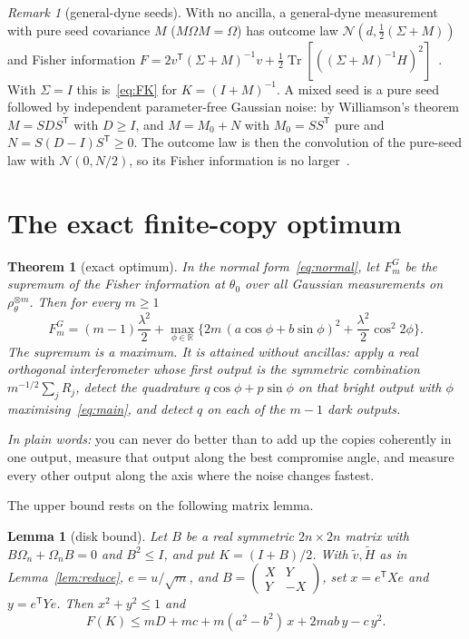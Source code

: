 \documentclass[11pt,a4paper]{article}
\newtheorem{theorem}{Theorem}
\newtheorem{lemma}{Lemma}
\theoremstyle{definition}\newtheorem{definition}{Definition}
\theoremstyle{remark}\newtheorem{remark}{Remark}
\newcommand{\R}{\mathbb R}
\newcommand{\tr}{\operatorname{Tr}}
\newcommand{\takeaway}[1]{\par\smallskip\noindent\textit{In plain words:} #1\par\smallskip}
\begin{document}
\begin{remark}[general-dyne seeds]\label{rem:seed}
With no ancilla, a general-dyne measurement with pure seed covariance $M$ ($M\Omega M=\Omega$) has outcome law $\mathcal N(d,\tfrac12(\Sigma+M))$ and Fisher information $F=2v^{\mathsf T}(\Sigma+M)^{-1}v+\tfrac12\tr[((\Sigma+M)^{-1}H)^2]$~\cite{Cenni2022,Navarro2025}. With $\Sigma=I$ this is~\eqref{eq:FK} for $K=(I+M)^{-1}$. A mixed seed is a pure seed followed by independent parameter-free Gaussian noise: by Williamson's theorem $M=SDS^{\mathsf T}$ with $D\ge I$, and $M=M_0+N$ with $M_0=SS^{\mathsf T}$ pure and $N=S(D-I)S^{\mathsf T}\ge0$. The outcome law is then the convolution of the pure-seed law with $\mathcal N(0,N/2)$, so its Fisher information is no larger~\cite{Cenni2022}.
\end{remark}

\section{The exact finite-copy optimum}\label{sec:main}

\begin{theorem}[exact optimum]\label{thm:main}
In the normal form~\eqref{eq:normal}, let $F_m^G$ be the supremum of the Fisher information at $\theta_0$ over all Gaussian measurements on $\rho_\theta^{\otimes m}$. Then for every $m\ge1$
\begin{equation}\label{eq:main}
\boxed{\;F_m^G=(m-1)\frac{\lambda^2}{2}+\max_{\phi\in\R}\Big\{2m\,(a\cos\phi+b\sin\phi)^2+\frac{\lambda^2}{2}\cos^2 2\phi\Big\}.\;}
\end{equation}
The supremum is a maximum. It is attained without ancillas: apply a real orthogonal interferometer whose first output is the symmetric combination $m^{-1/2}\sum_jR_j$, detect the quadrature $q\cos\phi+p\sin\phi$ on that bright output with $\phi$ maximising~\eqref{eq:main}, and detect $q$ on each of the $m-1$ dark outputs.
\end{theorem}

\takeaway{you can never do better than to add up the copies coherently in one output, measure that output along the best compromise angle, and measure every other output along the axis where the noise changes fastest.}

The upper bound rests on the following matrix lemma.

\begin{lemma}[disk bound]\label{lem:bound}
Let $B$ be a real symmetric $2n\times2n$ matrix with $B\Omega_n+\Omega_nB=0$ and $B^2\le I$, and put $K=(I+B)/2$. With $\tilde v,\tilde H$ as in Lemma~\ref{lem:reduce}, $e=u/\sqrt m$, and $B=\left(\begin{smallmatrix}X&Y\\Y&-X\end{smallmatrix}\right)$, set $x=e^{\mathsf T}Xe$ and $y=e^{\mathsf T}Ye$. Then $x^2+y^2\le1$ and
\begin{equation}\label{eq:disk}
F(K)\le mD+mc+m(a^2-b^2)\,x+2mab\,y-c\,y^2 .
\end{equation}
\end{lemma}
\end{document}
